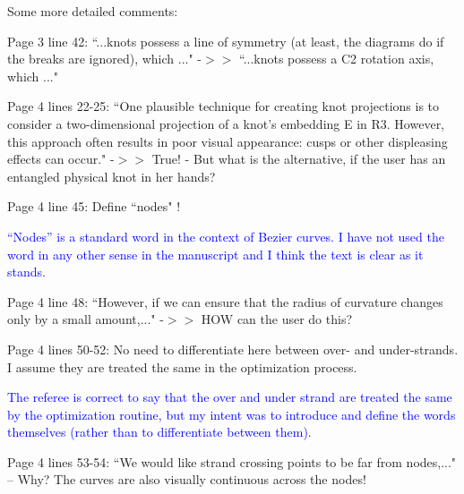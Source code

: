 \documentclass[12pt]{article}
\begin{document}
Some more detailed comments:

Page 3 line 42: ``...knots possess a line of symmetry (at least, the
diagrams do if the breaks are ignored), which ..."  -$>>$ ``...knots
possess a C2 rotation axis, which ..."

Page 4 lines 22-25: ``One plausible technique for creating knot
projections is to consider a two-dimensional projection of a knot's
embedding E in R3. However, this approach often results in poor visual
appearance: cusps or other displeasing effects can occur."  -$>>$ True!
- But what is the alternative, if the user has an entangled physical
knot in her hands?

Page 4 line 45: Define ``nodes" !

\textcolor{blue}{``Nodes'' is a standard word in the context of Bezier
  curves. I have not used the word in any other sense in the
  manuscript and I think the text is clear as it stands.}

Page 4 line 48: ``However, if we can ensure that the radius of
curvature changes only by a small amount,..."  -$>>$ HOW can the user do
this?

Page 4 lines 50-52: No need to differentiate here between over- and
under-strands.  I assume they are treated the same in the optimization
process.

\textcolor{blue}{The referee is correct to say that the over and under
  strand are treated the same by the optimization routine, but my
  intent was to introduce and define the words themselves (rather than
  to differentiate between them).}

Page 4 lines 53-54: ``We would like strand crossing points to be far
from nodes,..."  -- Why?  The curves are also visually continuous across
the nodes!
\end{document}
